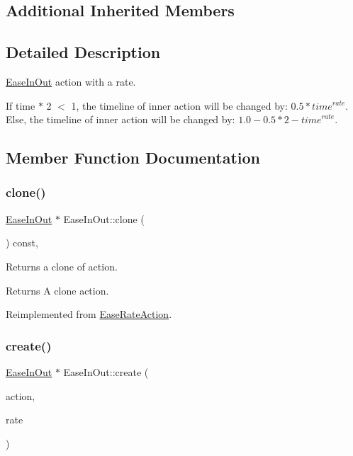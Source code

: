 \subsection*{Additional Inherited Members}


\subsection{Detailed Description}
\hyperlink{classEaseInOut}{Ease\+In\+Out} action with a rate. 

If time $\ast$ 2 $<$ 1, the timeline of inner action will be changed by\+: $0.5*{ time }^{ rate }$. Else, the timeline of inner action will be changed by\+: $1.0-0.5*{ 2-time }^{ rate }$. 

\subsection{Member Function Documentation}
\mbox{\label{classEaseInOut_a5bee2d31db0c1fefd2656c8eedd5831e}} 
\subsubsection{\texorpdfstring{clone()}{clone()}}
{\footnotesize\ttfamily \hyperlink{classEaseInOut}{Ease\+In\+Out} $\ast$ Ease\+In\+Out\+::clone (\begin{DoxyParamCaption}\item[{void}]{ }\end{DoxyParamCaption}) const\hspace{0.3cm}{\ttfamily [override]}, {\ttfamily [virtual]}}

Returns a clone of action.

\begin{DoxyReturn}{Returns}
A clone action. 
\end{DoxyReturn}


Reimplemented from \hyperlink{classEaseRateAction_a50323a94f7587203d7b02bb66fe2e67e}{Ease\+Rate\+Action}.

\mbox{\label{classEaseInOut_a958386e97d4c1988444cc4f4acf33102}} 
\subsubsection{\texorpdfstring{create()}{create()}}
{\footnotesize\ttfamily \hyperlink{classEaseInOut}{Ease\+In\+Out} $\ast$ Ease\+In\+Out\+::create (\begin{DoxyParamCaption}\item[{\hyperlink{classActionInterval}{Action\+Interval} $\ast$}]{action,  }\item[{float}]{rate }\end{DoxyParamCaption})\hspace{0.3cm}{\ttfamily [static]}}



